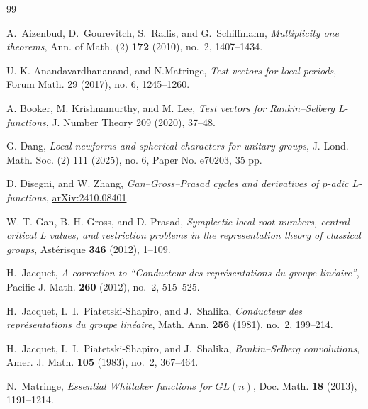 \documentclass[11pt, a4paper]{amsart}
\newcommand{\GL}{{\mathrm{GL}}}
\theoremstyle{plain}
\theoremstyle{plain}
\theoremstyle{plain}
\theoremstyle{plain}
\theoremstyle{remark}
\theoremstyle{definition}
\theoremstyle{plain}
\numberwithin{equation}{section}
\begin{document}
\begin{thebibliography}{99}

A.~Aizenbud, D.~Gourevitch, S.~Rallis, and G.~Schiffmann,
\emph{Multiplicity one theorems},
Ann. of Math. (2) \textbf{172} (2010), no.~2, 1407--1434.

U. K. Anandavardhananand, and N.Matringe,
{\it Test vectors for local periods},
Forum Math. 29 (2017), no. 6, 1245--1260.



A. Booker, M. Krishnamurthy, and M. Lee, 
{\it Test vectors for Rankin--Selberg L-functions},
J. Number Theory 209 (2020), 37--48.

G. Dang,
{\it Local newforms and spherical characters for unitary groups},
J. Lond. Math. Soc. (2) 111 (2025), no. 6, Paper No. e70203, 35 pp.

D. Disegni, and W. Zhang,
{\it Gan--Gross--Prasad cycles and derivatives of $p$-adic $L$-functions},
\href{https://arxiv.org/abs/2410.08401}{arXiv:2410.08401}.


W. T. Gan, B. H. Gross, and D. Prasad, {\it Symplectic local root numbers, central critical L values, and restriction problems in the representation theory of classical groups}, Ast\'erisque {\bf 346} (2012), 1--109.

H.~Jacquet,
\emph{A correction to ``Conducteur des repr\'esentations du groupe
lin\'eaire''},
Pacific J. Math. \textbf{260} (2012), no.~2, 515--525.

H.~Jacquet, I.~I.~Piatetski-Shapiro, and J.~Shalika,
\emph{Conducteur des repr\'esentations du groupe lin\'eaire},
Math. Ann. \textbf{256} (1981), no.~2, 199--214.

H.~Jacquet, I.~I.~Piatetski-Shapiro, and J.~Shalika,
\emph{Rankin--Selberg convolutions},
Amer. J. Math. \textbf{105} (1983), no.~2, 367--464.

N.~Matringe,
\emph{Essential Whittaker functions for $GL(n)$},
Doc. Math. \textbf{18} (2013), 1191--1214.


\end{thebibliography}
\end{document}
